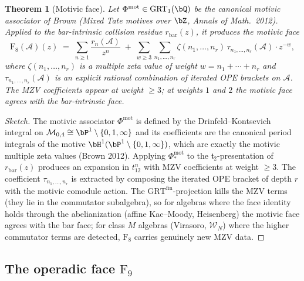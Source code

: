 \documentclass[11pt]{article}
\theoremstyle{plain}
\newtheorem{theorem}{Theorem}[section]
\theoremstyle{definition}
\theoremstyle{remark}
\newcommand{\cA}{\mathcal{A}}
\newcommand{\Walg}{\mathcal{W}}
\begin{document}
\begin{theorem}[Motivic face]\label{thm:motivic-face}
Let $\Phi^{\mathrm{mot}}\in\mathrm{GRT}_1(\bQ)$ be the canonical
motivic associator of Brown (\emph{Mixed Tate motives over $\bZ$},
Annals of Math.\ 2012). Applied to the bar-intrinsic collision
residue $r_{\mathrm{bar}}(z)$, it produces the \emph{motivic face}
\[
 \mathrm{F}_8(\cA)(z)
 \;=\;
 \sum_{n\geq 1}\frac{r_n(\cA)}{z^n}
 \;+\;
 \sum_{w\geq 3}\sum_{n_1,\ldots,n_r}
 \zeta(n_1,\ldots,n_r)\,\tau_{n_1,\ldots,n_r}(\cA)\cdot z^{-w},
\]
where $\zeta(n_1,\ldots,n_r)$ is a multiple zeta value of weight
$w=n_1+\cdots+n_r$ and $\tau_{n_1,\ldots,n_r}(\cA)$ is an explicit
rational combination of iterated OPE brackets on $\cA$. The MZV
coefficients appear at weight $\geq 3$; at weights $1$ and $2$ the
motivic face agrees with the bar-intrinsic face.
\end{theorem}

\begin{proof}[Sketch]
The motivic associator $\Phi^{\mathrm{mot}}$ is defined by the
Drinfeld--Kontsevich integral on $\mathcal{M}_{0,4}\cong\bP^1\setminus\{0,1,\infty\}$
and its coefficients are the canonical period integrals of the
motive $\bH^1(\bP^1\setminus\{0,1,\infty\})$, which are exactly the
motivic multiple zeta values (Brown 2012). Applying
$\Phi^{\mathrm{mot}}_*$ to the
$\widehat{\mathfrak{t}}_2$-presentation of $r_{\mathrm{bar}}(z)$
produces an expansion in $t_{12}^n$ with MZV coefficients at weight
$\geq 3$. The coefficient $\tau_{n_1,\ldots,n_r}$ is extracted by
composing the iterated OPE bracket of depth $r$ with the motivic
comodule action. The $\mathrm{GRT}^{\mathrm{fin}}$-projection kills
the MZV terms (they lie in the commutator subalgebra), so for
algebras where the face identity holds through the abelianization
(affine Kac--Moody, Heisenberg) the motivic face agrees with the
bar face; for class $M$ algebras (Virasoro, $\Walg_N$) where the
higher commutator terms are detected, $\mathrm{F}_8$ carries
genuinely new MZV data.
\end{proof}

\subsection{The operadic face $\mathrm{F}_9$}\label{sec:operadic-face}
\end{document}
